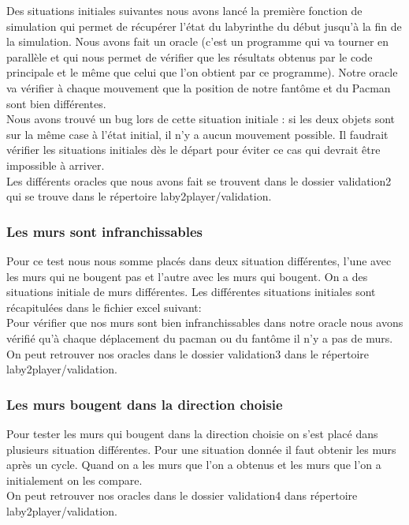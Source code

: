 Des situations initiales suivantes nous avons lancé la première fonction de simulation qui permet de récupérer l'état du labyrinthe du début jusqu'à la fin de la simulation. Nous avons fait un oracle (c'est un programme qui va tourner en parallèle et qui nous permet de vérifier que les résultats obtenus par le code principale et le même que celui que l'on obtient par ce programme). Notre oracle va vérifier à chaque mouvement que la position de notre fantôme et du Pacman sont bien différentes.\\

Nous avons trouvé un bug lors de cette situation initiale : si les deux objets sont sur la même case à l'état initial, il n'y a aucun mouvement possible. Il faudrait vérifier les situations initiales dès le départ pour éviter ce cas qui devrait être impossible à arriver.\\

Les différents oracles que nous avons fait se trouvent dans le dossier validation2 qui se trouve dans le répertoire laby2player/validation.\\


\subsubsection{Les murs sont infranchissables}
Pour ce test nous nous somme placés dans deux situation différentes, l'une avec les murs qui ne bougent pas et l'autre avec les murs qui bougent. On a des situations initiale de murs différentes. Les différentes situations initiales sont récapitulées dans le fichier excel suivant:\\
Pour vérifier que nos murs sont bien infranchissables dans notre oracle nous avons vérifié qu'à chaque déplacement du pacman ou du fantôme il n'y a pas de murs. On peut retrouver nos oracles dans le dossier validation3 dans le répertoire laby2player/validation.\\


\subsubsection{Les murs bougent dans la direction choisie}
Pour tester les murs qui bougent dans la direction choisie on s'est placé dans plusieurs situation différentes. Pour une situation donnée il faut obtenir les murs après un cycle. Quand on a les murs que l'on a obtenus et les murs que l'on a initialement on les compare.\\
On peut retrouver nos oracles dans le dossier validation4 dans répertoire laby2player/validation.\\
 

